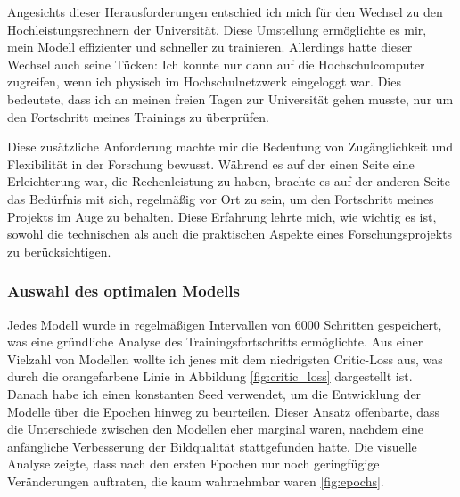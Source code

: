 \documentclass[a4paper, 12pt]{article}
\begin{document}
Angesichts dieser Herausforderungen entschied ich mich für den Wechsel zu den Hochleistungsrechnern der Universität. Diese Umstellung ermöglichte es mir, mein Modell effizienter und schneller zu trainieren. Allerdings hatte dieser Wechsel auch seine Tücken: Ich konnte nur dann auf die Hochschulcomputer zugreifen, wenn ich physisch im Hochschulnetzwerk eingeloggt war. Dies bedeutete, dass ich an meinen freien Tagen zur Universität gehen musste, nur um den Fortschritt meines Trainings zu überprüfen.

Diese zusätzliche Anforderung machte mir die Bedeutung von Zugänglichkeit und Flexibilität in der Forschung bewusst. Während es auf der einen Seite eine Erleichterung war, die Rechenleistung zu haben, brachte es auf der anderen Seite das Bedürfnis mit sich, regelmäßig vor Ort zu sein, um den Fortschritt meines Projekts im Auge zu behalten. Diese Erfahrung lehrte mich, wie wichtig es ist, sowohl die technischen als auch die praktischen Aspekte eines Forschungsprojekts zu berücksichtigen.




\subsubsection{Auswahl des optimalen Modells}
Jedes Modell wurde in regelmäßigen Intervallen von 6000 Schritten gespeichert, was eine gründliche Analyse des Trainingsfortschritts ermöglichte. Aus einer Vielzahl von Modellen wollte ich jenes mit dem niedrigsten Critic-Loss aus, was durch die orangefarbene Linie in Abbildung \ref{fig:critic_loss} dargestellt ist. Danach habe ich einen konstanten Seed verwendet, um die Entwicklung der Modelle über die Epochen hinweg zu beurteilen. Dieser Ansatz offenbarte, dass die Unterschiede zwischen den Modellen eher marginal waren, nachdem eine anfängliche Verbesserung der Bildqualität stattgefunden hatte. Die visuelle Analyse zeigte, dass nach den ersten Epochen nur noch geringfügige Veränderungen auftraten, die kaum wahrnehmbar waren \ref{fig:epochs}.
\end{document}
